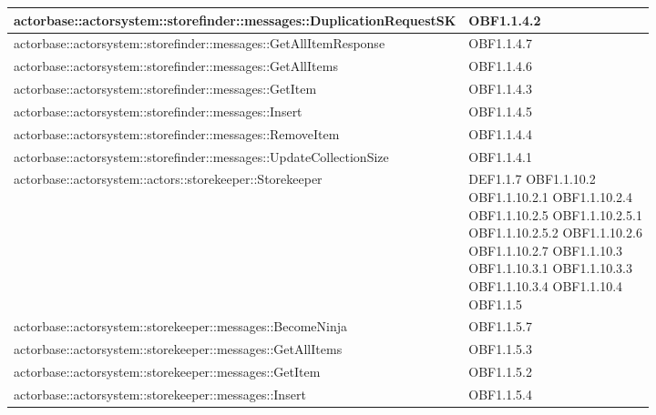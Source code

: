 \documentclass{scalatekids-article}
\begin{document}
\begin{longtable}[H]{|p{12cm}|p{5.5cm}|}
  \hline
  actorbase::actorsystem::storefinder::messages::DuplicationRequestSK & \multiLineCell[t]{OBF1.1.4.2\\}\\
  \hline
  actorbase::actorsystem::storefinder::messages::GetAllItemResponse & \multiLineCell[t]{OBF1.1.4.7\\}\\
  \hline
  actorbase::actorsystem::storefinder::messages::GetAllItems & \multiLineCell[t]{OBF1.1.4.6\\}\\
  \hline
  actorbase::actorsystem::storefinder::messages::GetItem & \multiLineCell[t]{OBF1.1.4.3\\}\\
  \hline
  actorbase::actorsystem::storefinder::messages::Insert & \multiLineCell[t]{OBF1.1.4.5\\}\\
  \hline
  actorbase::actorsystem::storefinder::messages::RemoveItem & \multiLineCell[t]{OBF1.1.4.4\\}\\
  \hline
  actorbase::actorsystem::storefinder::messages::UpdateCollectionSize & \multiLineCell[t]{OBF1.1.4.1\\}\\
  \hline
  actorbase::actorsystem::actors::storekeeper::Storekeeper & \multiLineCell[t]{DEF1.1.7 OBF1.1.10.2\\OBF1.1.10.2.1 OBF1.1.10.2.4\\OBF1.1.10.2.5 OBF1.1.10.2.5.1\\OBF1.1.10.2.5.2 OBF1.1.10.2.6\\OBF1.1.10.2.7 OBF1.1.10.3\\OBF1.1.10.3.1 OBF1.1.10.3.3\\OBF1.1.10.3.4 OBF1.1.10.4\\OBF1.1.5}\\
  \hline
  actorbase::actorsystem::storekeeper::messages::BecomeNinja & \multiLineCell[t]{OBF1.1.5.7\\}\\
  \hline
  actorbase::actorsystem::storekeeper::messages::GetAllItems & \multiLineCell[t]{OBF1.1.5.3\\}\\
  \hline
  actorbase::actorsystem::storekeeper::messages::GetItem & \multiLineCell[t]{OBF1.1.5.2\\}\\
  \hline
  actorbase::actorsystem::storekeeper::messages::Insert & \multiLineCell[t]{OBF1.1.5.4\\}\\

\end{longtable}
\end{document}
